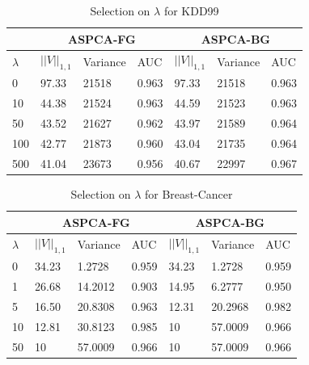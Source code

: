\begin{table}
\centering
\caption{Selection on $\lambda$ for KDD99}

\begin{tabular}{|l|l|l|l|l|l|l|}
\hline
\multicolumn{1}{|l|}{} & \multicolumn{3}{c|}{ASPCA-FG}    & \multicolumn{3}{c|}{ASPCA-BG}    \\ \hline
$\lambda$ & $||V||_{1,1}$ & Variance & AUC   & $||V||_{1,1}$ & Variance & AUC   \\ \hline
0         & 97.33         & 21518    & 0.963 & 97.33         & 21518    & 0.963 \\
10        & 44.38         & 21524    & 0.963 & 44.59         & 21523    & 0.963 \\
50        & 43.52         & 21627    & 0.962 & 43.97         & 21589    & 0.964 \\
100       & 42.77         & 21873    & 0.960 & 43.04         & 21735    & 0.964 \\
500       & 41.04         & 23673    & 0.956 & 40.67         & 22997    & 0.967 \\ \hline
\end{tabular}
\end{table}
\begin{table}
\caption{Selection on $\lambda$ for Breast-Cancer}
\begin{tabular}{|l|l|l|l|l|l|l|}
\hline
\multicolumn{1}{|l|}{} & \multicolumn{3}{c|}{ASPCA-FG}    & \multicolumn{3}{c|}{ASPCA-BG}    \\ \hline
$\lambda$              & $||V||_{1,1}$ & Variance & AUC   & $||V||_{1,1}$ & Variance & AUC   \\ \hline
0                      & 34.23         & 1.2728   & 0.959 & 34.23         & 1.2728   & 0.959 \\
1                      & 26.68         & 14.2012  & 0.903 & 14.95         & 6.2777   & 0.950 \\
5                      & 16.50         & 20.8308  & 0.963 & 12.31         & 20.2968  & 0.982 \\
10                     & 12.81         & 30.8123  & 0.985 & 10            & 57.0009  & 0.966 \\
50                     & 10            & 57.0009  & 0.966 & 10            & 57.0009  & 0.966 \\ \hline
\end{tabular}
	\label{Table:parameter:lambada}

\end{table}
